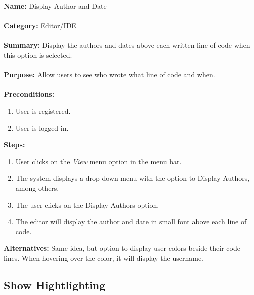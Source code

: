 \documentclass[14pt, a4paper]{article}
\begin{document}
\begin{framed}
	\noindent\textbf{Name:} Display Author and Date \\ \\
	\textbf{Category:} Editor/IDE \\ \\
	\textbf{Summary:} Display the authors and dates above each written line of code when this option is selected. \\ \\
	\textbf{Purpose:} Allow users to see who wrote what line of code and when. \\ \\
	\textbf{Preconditions:} 
	\begin{enumerate}
		\item User is registered.
		\item User is logged in.
	\end{enumerate}	
	\textbf{Steps:}
	\begin{enumerate}
		\item User clicks on the \textit{View} menu option in the menu bar.
		\item The system displays a drop-down menu with the option to Display Authors, among others.
		\item The user clicks on the Display Authors option.
		\item The editor will display the author and date in small font above each line of code.
	\end{enumerate}
	\textbf{Alternatives:} Same idea, but option to display user colors beside their code lines. When hovering over the color, it will display the username.
\end{framed}

\newpage

\subsection{Show Hightlighting}
\end{document}
